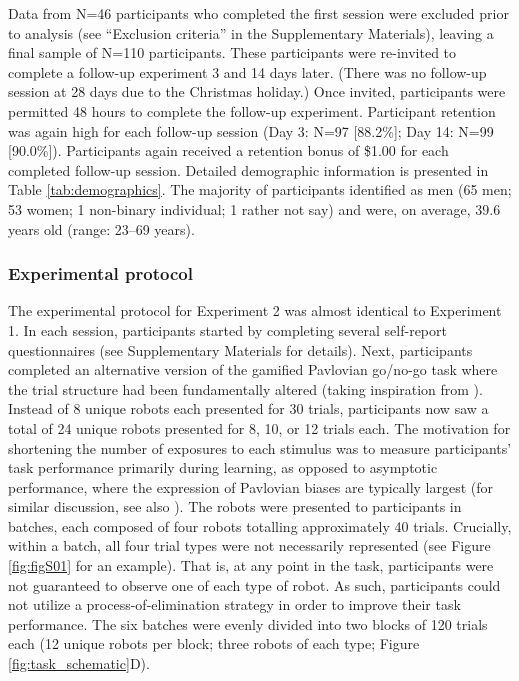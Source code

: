 \documentclass[a4paper,12pt]{article}
\begin{document}
\begin{refsection}[main]
Data from N=46 participants who completed the first session were excluded prior to analysis (see ``Exclusion criteria'' in the Supplementary Materials), leaving a final sample of N=110 participants. These participants were re-invited to complete a follow-up experiment 3 and 14 days later. (There was no follow-up session at 28 days due to the Christmas holiday.) Once invited, participants were permitted 48 hours to complete the follow-up experiment. Participant retention was again high for each follow-up session (Day 3: N=97 [88.2\%]; Day 14: N=99 [90.0\%]). Participants again received a retention bonus of \$1.00 for each completed follow-up session. Detailed demographic information is presented in Table \ref{tab:demographics}. The majority of participants identified as men (65 men; 53 women; 1 non-binary individual; 1 rather not say) and were, on average, 39.6 years old (range: 23--69 years).

\subsubsection*{Experimental protocol}

The experimental protocol for Experiment 2 was almost identical to Experiment 1. In each session, participants started by completing several self-report questionnaires (see Supplementary Materials for details). Next, participants completed an alternative version of the gamified Pavlovian go/no-go task where the trial structure had been fundamentally altered (taking inspiration from \cite{wittmann2008striatal}). Instead of 8 unique robots each presented for 30 trials, participants now saw a total of 24 unique robots presented for 8, 10, or 12 trials each. The motivation for shortening the number of exposures to each stimulus was to measure participants' task performance primarily during learning, as opposed to asymptotic performance, where the expression of Pavlovian biases are typically largest (for similar discussion, see also \cite{zorowitzPLACEHOLDER}). The robots were presented to participants in batches, each composed of four robots totalling approximately 40 trials. Crucially, within a batch, all four trial types were not necessarily represented (see Figure \ref{fig:figS01} for an example). That is, at any point in the task, participants were not guaranteed to observe one of each type of robot. As such, participants could not utilize a process-of-elimination strategy in order to improve their task performance. The six batches were evenly divided into two blocks of 120 trials each (12 unique robots per block; three robots of each type; Figure \ref{fig:task_schematic}D).


\end{refsection}
\end{document}
